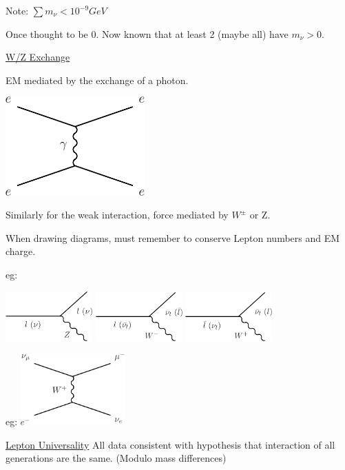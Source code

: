 {Note: $\sum m_\nu < 10^{-9} GeV$

Once thought to be 0.  Now known that at least 2 (maybe all) have $m_\nu > 0$.

\clearpage

\underline{W/Z Exchange}

EM mediated by the exchange of a photon.

\bc
\includegraphics[width=0.4\textwidth]{./ElectronScattering.pdf}
\ec


Similarly for the weak interaction, force mediated by $W^{\pm}$ or Z.

When drawing diagrams, must remember to conserve Lepton numbers and EM charge.

eg: 

\includegraphics[width=0.25\textwidth]{./ZVertex.pdf}  \hfill 
\includegraphics[width=0.25\textwidth]{./Wminus.pdf}   \hfill 
\includegraphics[width=0.25\textwidth]{./Wplus.pdf}   

eg:
\bc
\includegraphics[width=0.3\textwidth]{./NuScattering.pdf}   
\ec

\underline{Lepton Universality}
All data consistent with hypothesis that interaction of all generations are the same.
(Modulo mass differences)

}
